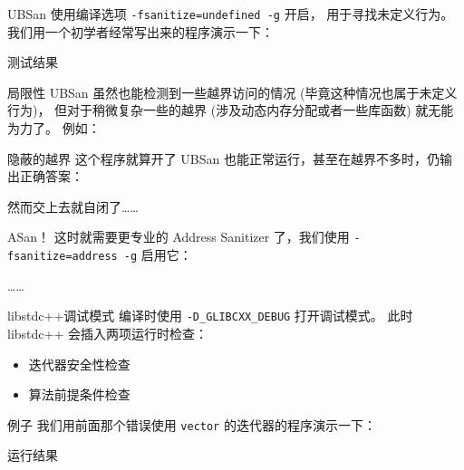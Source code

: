 \documentclass[10pt,mathserif]{beamer}
\begin{document}
\begin{frame}{UBSan}
	使用编译选项 \lstinline!-fsanitize=undefined -g! 开启，
	用于寻找未定义行为。我们用一个初学者经常写出来的程序演示一下：
	
\end{frame}

\begin{frame}{测试结果}
	
\end{frame}

\begin{frame}{局限性}
	UBSan 虽然也能检测到一些越界访问的情况 (毕竟这种情况也属于未定义行为)，
	但对于稍微复杂一些的越界 (涉及动态内存分配或者一些库函数) 就无能为力了。
	例如：
	
\end{frame}

\begin{frame}{隐蔽的越界}
	这个程序就算开了 UBSan 也能正常运行，甚至在越界不多时，仍输出正确答案：
	
	然而交上去就自闭了……
\end{frame}

\begin{frame}{ASan！}
	这时就需要更专业的 Address Sanitizer 了，我们使用
	\lstinline|-fsanitize=address -g| 启用它：
	
	……
	
\end{frame}

\begin{frame}{libstdc++}{调试模式}
	编译时使用 \lstinline!-D_GLIBCXX_DEBUG! 打开调试模式。
	此时 libstdc++ 会插入两项运行时检查：
	\begin{itemize}
		\item 迭代器安全性检查
		\item 算法前提条件检查
	\end{itemize}
\end{frame}

\begin{frame}{例子}
	我们用前面那个错误使用 \lstinline!vector! 的迭代器的程序演示一下：
	
\end{frame}

\begin{frame}{运行结果}
	
\end{frame}
\end{document}
